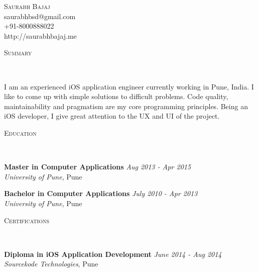 \documentclass[9pt]{article}
\newenvironment{changemargin}[2]{%
  \begin{list}{}{%
    \setlength{\topsep}{0pt}%
    \setlength{\leftmargin}{#1}%
    \setlength{\rightmargin}{#2}%
    \setlength{\listparindent}{\parindent}%
    \setlength{\itemindent}{\parindent}%
    \setlength{\parsep}{\parskip}%
  }%
  \item[]}{\end{list}
}
\newcommand{\lineover}{
    \begin{changemargin}{-0.05in}{-0.05in}
        \vspace*{-8pt}
        \hrulefill \\
        \vspace*{-2pt}
    \end{changemargin}
}
\newcommand{\header}[1]{
    \begin{changemargin}{-0.5in}{-0.5in}
        \scshape{#1}\\
    \lineover
    \end{changemargin}
}
\newcommand{\contact}[4]{
    \begin{changemargin}{-0.5in}{-0.5in}
        \begin{center}
            {\Large \scshape {#1}}\\ \smallskip
            {#2}\\ \smallskip
            {#3}\\ \smallskip
            {#4}\smallskip
        \end{center}
    \end{changemargin}
}
\newenvironment{body} {
    \vspace*{-16pt}
    \begin{changemargin}{-0.25in}{-0.5in}
  }
    {\end{changemargin}
}
\begin{document}
\contact{Saurabh Bajaj}{saurabhbsd@gmail.com}{+91-8000888022}{http://saurabhbajaj.me}


\header{Summary}

\begin{body}
    \vspace{14pt}
  I am an experienced iOS application engineer currently working in Pune, India. I like to come up with simple solutions to difficult problems. Code quality, maintainability and pragmatism are my core programming principles. Being an iOS developer, I give great attention to the UX and UI of the project.

\end{body}

\smallskip


\header{Education}

\begin{body}
    \vspace{14pt}
    \textbf{Master in Computer Applications}{} \hfill \emph{Aug 2013 - Apr 2015}{} \\
    \emph{University of Pune}, Pune{} \\
\end{body}

\begin{body}
    \vspace{14pt}
    \textbf{Bachelor in Computer Applications}{} \hfill \emph{July 2010 - Apr 2013}{} \\
    \emph{University of Pune}, Pune{} \\
\end{body}

\smallskip


\header{Certifications}

\begin{body}
    \vspace{14pt}
    \textbf{Diploma in iOS Application Development}{} \hfill \emph{June 2014 - Aug 2014}{} \\
    \emph{Sourcekode Technologies}, Pune{} \\
\end{body}

\smallskip
\end{document}

